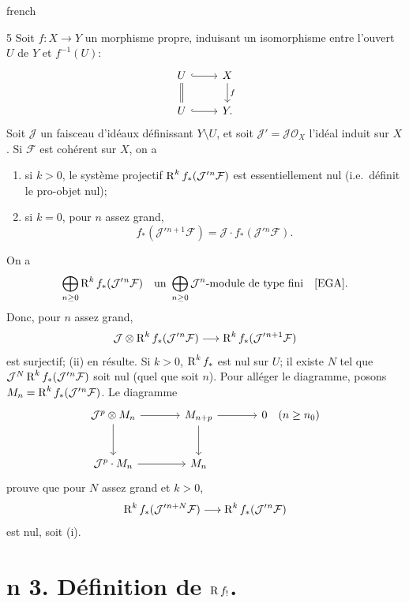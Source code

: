 \begin{hyphenrules}{french}
\begin{bookproposition}{5}\label{app:prop5}
Soit $f\colon X\to Y$ un morphisme propre, induisant un isomorphisme
entre l'ouvert $U$ de $Y$ et $f^{-1}(U)$:
\[
\begin{tikzcd}
U \ar[r,hook] \ar[d,equals] & X \ar[d,"f"] \\
U \ar[r,hook] & Y.
\end{tikzcd}
\]
Soit $\mathcal J$ un faisceau d'id\'eaux d\'efinissant $Y\setminus U$,
et soit $\mathcal J'=\mathcal J\mathcal O_X$ l'id\'eal induit sur $X$.
Si $\mathcal F$ est coh\'erent sur $X$, on a
\begin{enumerate}
\item[(i)] si $k>0$, le syst\`eme projectif
$\operatorname{R}^k f_*(\mathcal J'{}^n\mathcal F)$ est essentiellement nul
(i.e.\ d\'efinit le pro-objet nul);
\item[(ii)] si $k=0$, pour $n$ assez grand,
\[
f_*(\mathcal J'{}^{n+1}\mathcal F)
=\mathcal J\cdot f_*(\mathcal J'{}^n\mathcal F).
\]
\end{enumerate}
\end{bookproposition}

On a
\[
\bigoplus_{n\ge0}\RR^k f_*(\mathcal J'{}^n\mathcal F)
\quad\text{un }\bigoplus_{n\ge0}\mathcal J^n\text{-module de type fini}
\quad\text{\cite[\nopp III]{EGA}}.
\]
Donc, pour $n$ assez grand,
\[
\mathcal J\otimes\operatorname{R}^k f_*(\mathcal J'{}^n\mathcal F)
\longrightarrow\operatorname{R}^k f_*(\mathcal J'{}^{n+1}\mathcal F)
\]
est surjectif; (ii) en r\'esulte. Si $k>0$, $\operatorname{R}^k f_*$ est nul sur $U$;
il existe $N$ tel que $\mathcal J^N\operatorname{R}^k f_*(\mathcal J'{}^n\mathcal F)$
soit nul (quel que soit $n$).
Pour all\'eger le diagramme, posons $M_n=\operatorname{R}^k f_*(\mathcal J'{}^n\mathcal F)$.
Le diagramme
\[
\begin{tikzcd}[row sep=large,column sep=large]
\mathcal J^p\otimes M_n \ar[r] \ar[d]
 & M_{n+p} \ar[r] \ar[d] & 0\quad(n\ge n_0) \\
\mathcal J^p\cdot M_n \ar[r] & M_n
\end{tikzcd}
\]
prouve que pour $N$ assez grand et $k>0$,
\[
\operatorname{R}^k f_*(\mathcal J'{}^{n+N}\mathcal F)
\longrightarrow\operatorname{R}^k f_*(\mathcal J'{}^n\mathcal F)
\]
est nul, soit (i).

\section*{n\textdegree{} 3. D\'efinition de $\operatorname{R} f_{!}$.}\label{app:sec3}


\end{hyphenrules}

